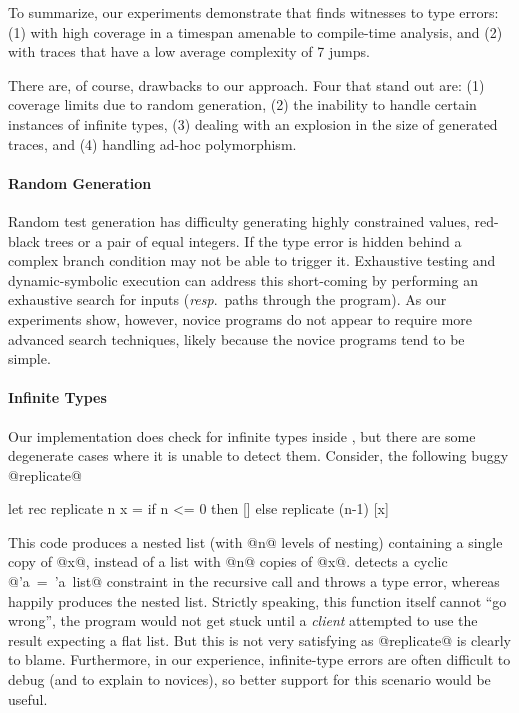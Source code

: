 To summarize, our experiments demonstrate that \nanomaly finds witnesses
to type errors: (1) with high coverage in a timespan amenable to
compile-time analysis, and (2) with traces that have a low average
complexity of 7 jumps.

There are, of course, drawbacks to our approach. Four that stand out
are: (1) coverage limits due to random generation, (2) the inability to
handle certain instances of infinite types, (3) dealing with an
explosion in the size of generated traces, and (4) handling ad-hoc
polymorphism.

\paragraph{Random Generation}
Random test generation has difficulty generating highly constrained
values, \eg red-black trees or a pair of equal integers. If the type
error is hidden behind a complex branch condition \nanomaly may not be
able to trigger it. Exhaustive testing and dynamic-symbolic execution
can address this short-coming by performing an exhaustive search for
inputs (\emph{resp}.\ paths through the program). As our experiments
show, however, novice programs do not appear to require more advanced
search techniques, likely because the novice programs tend to be simple.

\paragraph{Infinite Types}
Our implementation does check for infinite types inside \forcesym, but
there are some degenerate cases where it is unable to detect
them. Consider, the following buggy @replicate@
%
\begin{code}
  let rec replicate n x =
    if n <= 0 then []
              else replicate (n-1) [x]
\end{code}
%
This code produces a nested list (with @n@ levels of nesting) containing
a single copy of @x@, instead of a list with @n@ copies of @x@. \ocaml
detects a cyclic \hbox{@'a = 'a list@} constraint in the recursive call
and throws a type error, whereas \nanomaly happily %
produces the nested list.  Strictly speaking, this function itself cannot
``go wrong'', the program would not get stuck until a \emph{client}
attempted to use the result expecting a flat list. But this is not very
satisfying as @replicate@ is clearly to blame. Furthermore, in our
experience, infinite-type errors are often difficult to %
debug (and to explain to novices), so better support for this scenario
would be useful.

